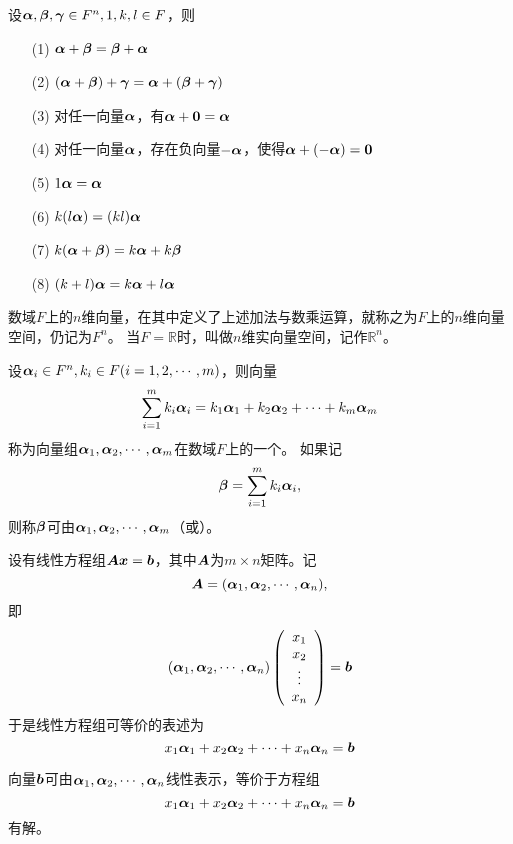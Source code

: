 \begin{dingyi}
  设$\alphabd,\betabd,\gammabd\in F^n, 1,k,l\in F$，则
  \begin{itemize}
  \item[(1)] $\alphabd+\betabd=\betabd+\alphabd$
  \item[(2)] $(\alphabd+\betabd)+\gammabd=\alphabd+(\betabd+\gammabd)$
  \item[(3)] 对任一向量$\alphabd$，有$\alphabd+\zero=\alphabd$
  \item[(4)] 对任一向量$\alphabd$，存在负向量$-\alphabd$，使得$\alphabd+(-\alphabd)=\zero$
  \item[(5)] $1\alphabd=\alphabd$
  \item[(6)] $k(l\alphabd)=(kl)\alphabd$
  \item[(7)] $k(\alphabd+\betabd)=k\alphabd+k\betabd$
  \item[(8)] $(k+l)\alphabd=k\alphabd+l\alphabd$
  \end{itemize}
\end{dingyi}

\begin{dingyi}[向量空间]
  数域$F$上的$n$维向量，在其中定义了上述加法与数乘运算，就称之为$F$上的$n$维向量空间，仍记为$F^n$。
  当$F=\mathbb R$时，叫做$n$维实向量空间，记作$\mathbb R^n$。
\end{dingyi}

\begin{dingyi}[线性表示]
  设$\alphabd_i\in F^n, k_i \in F (i=1,2,\cd,m)$，则向量
  $$
  \sum_{i=1}^m k_i\alphabd_i = k_1\alphabd_1 + k_2\alphabd_2+\cd + k_m\alphabd_m
  $$
  称为向量组$\alphabd_1,\alphabd_2,\cd,\alphabd_m$在数域$F$上的一个。  如果记
  $$\betabd=\sum_{i=1}^m k_i\alphabd_i,$$
  则称$\betabd$可由$\alphabd_1,\alphabd_2,\cd,\alphabd_m$（或）。
\end{dingyi}


设有线性方程组$\A\xx=\bb$，其中$\A$为$m\times n$矩阵。记
$$\A=(\alphabd_1,\alphabd_2,\cd,\alphabd_n),$$
即
$$
(\alphabd_1,\alphabd_2,\cd,\alphabd_n) \left(
\begin{array}{c}
  x_1\\
  x_2\\
  \vd\\
  x_n
\end{array}
\right)=\bb
$$
于是线性方程组可等价的表述为
$$
x_1\alphabd_1+x_2\alphabd_2+\cd+x_n\alphabd_n=\bb
$$
\begin{zhu*}
  向量$\bb$可由$\alphabd_1,\alphabd_2,\cd,\alphabd_n$线性表示，等价于方程组
  $$
  x_1\alphabd_1+x_2\alphabd_2+\cd+x_n\alphabd_n=\bb
  $$
  有解。
\end{zhu*}

